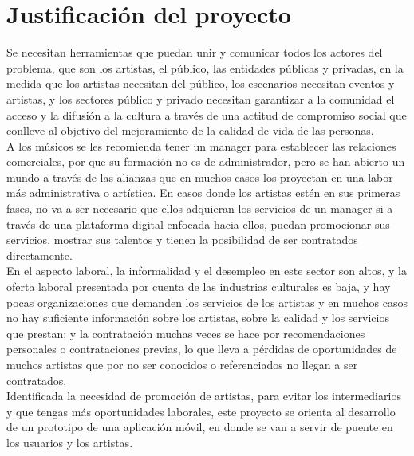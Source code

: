 \section{Justificación del proyecto}
Se necesitan herramientas que puedan unir y comunicar todos los actores del problema, que son los artistas, el público, las entidades públicas y privadas, en la medida que los artistas necesitan del público, los escenarios necesitan eventos y artistas, y los sectores público y privado necesitan garantizar a la comunidad el acceso y la difusión a la cultura a través de una actitud de compromiso social que conlleve al objetivo del mejoramiento de la calidad de vida de las personas.\\

A los músicos se les recomienda tener un manager para establecer las relaciones comerciales, por que su formación no es de administrador, pero se han abierto un mundo a través de las alianzas que en muchos casos los proyectan en una labor más administrativa o artística. En casos donde los artistas estén en sus primeras fases, no va a ser necesario que ellos adquieran los servicios de un manager si a través de una plataforma digital enfocada hacia ellos, puedan promocionar sus servicios, mostrar sus talentos y tienen la posibilidad de ser contratados directamente.\\

En el aspecto laboral, la informalidad y el desempleo en este sector son altos, y la oferta laboral presentada por cuenta de las industrias culturales es baja, y hay pocas organizaciones  que demanden los servicios de los artistas y en muchos casos no hay suficiente información sobre los artistas, sobre la calidad y los servicios que prestan; y la contratación muchas veces se hace por recomendaciones personales o contrataciones previas, lo que lleva a pérdidas de oportunidades de muchos artistas que por no ser conocidos o referenciados no llegan a ser contratados.\\

Identificada la necesidad de promoción de artistas, para evitar los intermediarios y que tengas más oportunidades laborales, este proyecto se orienta al  desarrollo de un prototipo de una aplicación móvil, en donde se van a servir de puente en los usuarios y los artistas.
